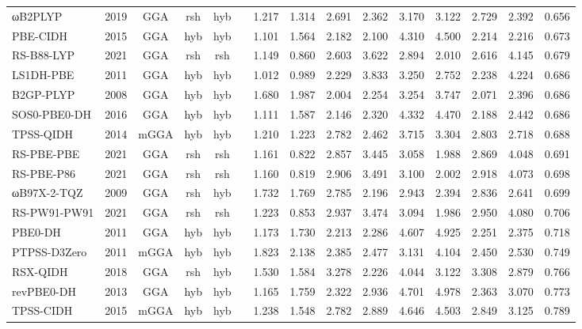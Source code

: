 \begin{landscape}
\begin{longtable}[c]{lcccccrrrrrrrrc}
ωB2PLYP          & 2019 & GGA  & rsh & hyb &     & 1.217 & 1.314 & 2.691  & 2.362  & 3.170  & 3.122  & 2.729  & 2.392  & 0.656 \\
PBE-CIDH         & 2015 & GGA  & hyb & hyb &     & 1.101 & 1.564 & 2.182  & 2.100  & 4.310  & 4.500  & 2.214  & 2.216  & 0.673 \\
RS-B88-LYP       & 2021 & GGA  & rsh & rsh &     & 1.149 & 0.860 & 2.603  & 3.622  & 2.894  & 2.010  & 2.616  & 4.145  & 0.679 \\
LS1DH-PBE        & 2011 & GGA  & hyb & hyb &     & 1.012 & 0.989 & 2.229  & 3.833  & 3.250  & 2.752  & 2.238  & 4.224  & 0.686 \\
B2GP-PLYP        & 2008 & GGA  & hyb & hyb &     & 1.680 & 1.987 & 2.004  & 2.254  & 3.254  & 3.747  & 2.071  & 2.396  & 0.686 \\
SOS0-PBE0-DH     & 2016 & GGA  & hyb & hyb &     & 1.111 & 1.587 & 2.146  & 2.320  & 4.332  & 4.470  & 2.188  & 2.442  & 0.686 \\
TPSS-QIDH        & 2014 & mGGA & hyb & hyb &     & 1.210 & 1.223 & 2.782  & 2.462  & 3.715  & 3.304  & 2.803  & 2.718  & 0.688 \\
RS-PBE-PBE       & 2021 & GGA  & rsh & rsh &     & 1.161 & 0.822 & 2.857  & 3.445  & 3.058  & 1.988  & 2.869  & 4.048  & 0.691 \\
RS-PBE-P86       & 2021 & GGA  & rsh & rsh &     & 1.160 & 0.819 & 2.906  & 3.491  & 3.100  & 2.002  & 2.918  & 4.073  & 0.698 \\
ωB97X-2-TQZ      & 2009 & GGA  & rsh & hyb &     & 1.732 & 1.769 & 2.785  & 2.196  & 2.943  & 2.394  & 2.836  & 2.641  & 0.699 \\
RS-PW91-PW91     & 2021 & GGA  & rsh & rsh &     & 1.223 & 0.853 & 2.937  & 3.474  & 3.094  & 1.986  & 2.950  & 4.080  & 0.706 \\
PBE0-DH          & 2011 & GGA  & hyb & hyb &     & 1.173 & 1.730 & 2.213  & 2.286  & 4.607  & 4.925  & 2.251  & 2.375  & 0.718 \\
PTPSS-D3Zero     & 2011 & mGGA & hyb & hyb &     & 1.823 & 2.138 & 2.385  & 2.477  & 3.131  & 4.104  & 2.450  & 2.530  & 0.749 \\
RSX-QIDH         & 2018 & GGA  & rsh & hyb &     & 1.530 & 1.584 & 3.278  & 2.226  & 4.044  & 3.122  & 3.308  & 2.879  & 0.766 \\
revPBE0-DH       & 2013 & GGA  & hyb & hyb &     & 1.165 & 1.759 & 2.322  & 2.936  & 4.701  & 4.978  & 2.363  & 3.070  & 0.773 \\
TPSS-CIDH        & 2015 & mGGA & hyb & hyb &     & 1.238 & 1.548 & 2.782  & 2.889  & 4.646  & 4.503  & 2.849  & 3.125  & 0.789 \\

\end{longtable}
\end{landscape}
